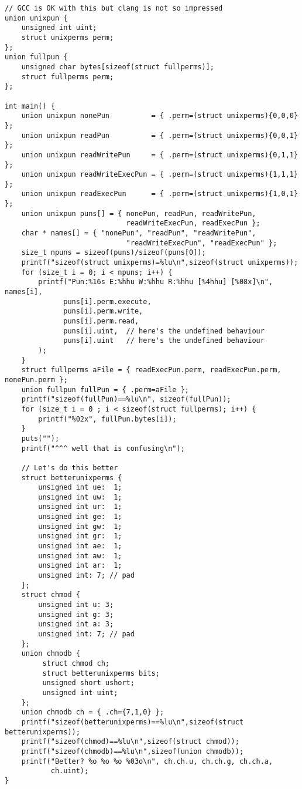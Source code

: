 \documentclass[11pt]{article}
\begin{document}
\begin{enumerate}
\begin{verbatim}
// GCC is OK with this but clang is not so impressed
union unixpun {
    unsigned int uint;
    struct unixperms perm;
};
union fullpun {
    unsigned char bytes[sizeof(struct fullperms)];
    struct fullperms perm;
};

int main() {
    union unixpun nonePun          = { .perm=(struct unixperms){0,0,0} };
    union unixpun readPun          = { .perm=(struct unixperms){0,0,1} };
    union unixpun readWritePun     = { .perm=(struct unixperms){0,1,1} };
    union unixpun readWriteExecPun = { .perm=(struct unixperms){1,1,1} };
    union unixpun readExecPun      = { .perm=(struct unixperms){1,0,1} };
    union unixpun puns[] = { nonePun, readPun, readWritePun, 
                             readWriteExecPun, readExecPun };
    char * names[] = { "nonePun", "readPun", "readWritePun", 
                             "readWriteExecPun", "readExecPun" };
    size_t npuns = sizeof(puns)/sizeof(puns[0]);
    printf("sizeof(struct unixperms)=%lu\n",sizeof(struct unixperms));
    for (size_t i = 0; i < npuns; i++) {
        printf("Pun:%16s E:%hhu W:%hhu R:%hhu [%4hhu] [%08x]\n", names[i], 
              puns[i].perm.execute,
              puns[i].perm.write,
              puns[i].perm.read,
              puns[i].uint,  // here's the undefined behaviour
              puns[i].uint   // here's the undefined behaviour
        );
    }
    struct fullperms aFile = { readExecPun.perm, readExecPun.perm, nonePun.perm };
    union fullpun fullPun = { .perm=aFile };
    printf("sizeof(fullPun)==%lu\n", sizeof(fullPun));
    for (size_t i = 0 ; i < sizeof(struct fullperms); i++) {
        printf("%02x", fullPun.bytes[i]);
    }
    puts("");
    printf("^^^ well that is confusing\n");

    // Let's do this better
    struct betterunixperms {
        unsigned int ue:  1;
        unsigned int uw:  1;
        unsigned int ur:  1;
        unsigned int ge:  1;
        unsigned int gw:  1;
        unsigned int gr:  1;
        unsigned int ae:  1;
        unsigned int aw:  1;
        unsigned int ar:  1;
        unsigned int: 7; // pad
    };
    struct chmod {
        unsigned int u: 3;        
        unsigned int g: 3;        
        unsigned int a: 3;
        unsigned int: 7; // pad
    };
    union chmodb {
         struct chmod ch;
         struct betterunixperms bits;
         unsigned short ushort;
         unsigned int uint;
    };
    union chmodb ch = { .ch={7,1,0} };
    printf("sizeof(betterunixperms)==%lu\n",sizeof(struct betterunixperms));
    printf("sizeof(chmod)==%lu\n",sizeof(struct chmod));
    printf("sizeof(chmodb)==%lu\n",sizeof(union chmodb));
    printf("Better? %o %o %o %03o\n", ch.ch.u, ch.ch.g, ch.ch.a,
           ch.uint);
}


\end{verbatim}
\end{enumerate}
\end{document}
